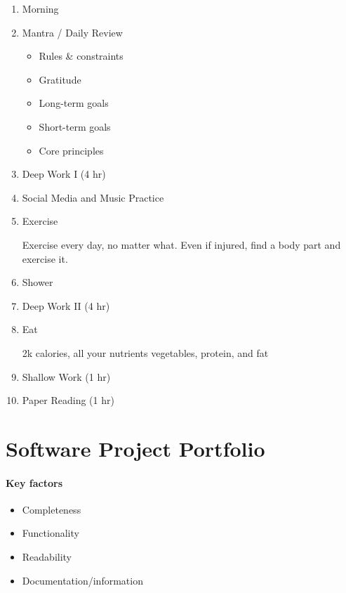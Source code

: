 \begin{enumerate}
\item
	Morning

\item
	Mantra / Daily Review
	\begin{itemize}
	\item
		Rules \& constraints
	\item
		Gratitude
	\item
		Long-term goals
	\item
		Short-term goals
	\item
		Core principles
	\end{itemize}

\item
	Deep Work I (4 hr)

\item
	Social Media and Music Practice

\item
	Exercise

	Exercise every day, no matter what. Even if injured, find a body part and exercise it.

\item
	Shower

\item
	Deep Work II (4 hr)

\item
	Eat

	2k calories, all your nutrients
	vegetables, protein, and fat

\item
	Shallow Work (1 hr)

\item
	Paper Reading (1 hr)
\end{enumerate}

\section{Software Project Portfolio}
\paragraph*{Key factors}
\begin{itemize}
\item Completeness
\item Functionality
\item Readability
\item Documentation/information

\end{itemize}

